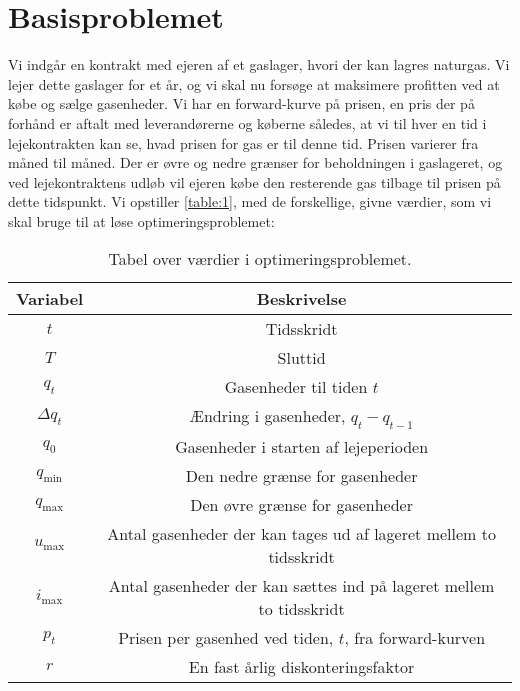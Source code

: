 \section{Basisproblemet}
Vi indgår en kontrakt med ejeren af et gaslager, hvori der kan lagres naturgas. Vi lejer dette gaslager for et år, og vi skal nu forsøge at maksimere profitten ved at købe og sælge gasenheder. Vi har en forward-kurve på prisen, en pris der på forhånd er aftalt med leverandørerne og køberne således, at vi til hver en tid i lejekontrakten kan se, hvad prisen for gas er til denne tid. Prisen varierer fra måned til måned. Der er øvre og nedre grænser for beholdningen i gaslageret, og ved lejekontraktens udløb vil ejeren købe den resterende gas tilbage til prisen på dette tidspunkt. Vi opstiller \autoref{table:1}, med de forskellige, givne værdier, som vi skal bruge til at løse optimeringsproblemet:

\begin{table}[H]
\centering
\begin{tabular}{|c | c|} 
 \hline
 Variabel & Beskrivelse \\ [0.5ex] 
 \hline\hline
 $t$ & Tidsskridt  \\ 
 $T$ & Sluttid  \\
 $q_{t}$ & Gasenheder til tiden $t$  \\
 $\Delta q_{t}$ & Ændring i gasenheder,    $q_{t}-q_{t-1}$ \\
 $q_{0}$ & Gasenheder i starten af lejeperioden  \\
 $q_{\min}$ & Den nedre grænse for gasenheder \\ 
 $q_{\max}$ & Den øvre grænse for gasenheder \\
 $u_{\max}$ & Antal gasenheder der kan tages ud af lageret mellem to tidsskridt \\ 
 $i_{\max}$ & Antal gasenheder der kan sættes ind på lageret mellem to tidsskridt \\ 
 $p_{t}$ & Prisen per gasenhed ved tiden, $t$, fra forward-kurven  \\
 $r$ & En fast årlig diskonteringsfaktor  \\
 [1ex]
 \hline
\end{tabular}
\caption{Tabel over værdier i optimeringsproblemet.}
\label{table:1}
\end{table}

